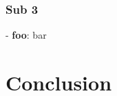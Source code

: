\documentclass[10pt]{article}
\begin{document}
\subsubsection{Sub 3}
- \textbf{foo}: bar\\

\section{Conclusion}

\end{document}

